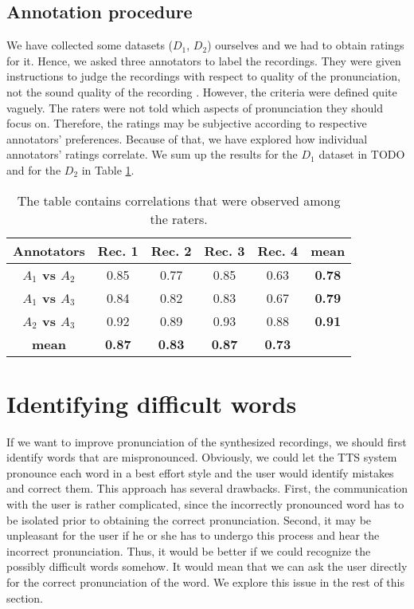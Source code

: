 \subsection{Annotation procedure}
We have collected some datasets ($D_1$, $D_2$) ourselves and we had to obtain ratings for it.
Hence, we asked three annotators to label the recordings.
They were given instructions to judge the recordings with respect to quality of the pronunciation, not the sound quality of the recording .
However, the criteria were defined quite vaguely.
The raters were not told which aspects of pronunciation they should focus on.
Therefore, the ratings may be subjective according to respective annotators' preferences.
Because of that, we have explored how individual annotators' ratings correlate.
We sum up the results for the $D_1$ dataset in TODO and for the $D_2$ in Table \ref{annotatorstbl}.
\begin{table}
\begin{center}
\begin{tabular}{ |c|c|c|c|c|c| } 
 \hline
 \textbf{Annotators} & \textbf{Rec. 1} & \textbf{Rec. 2} & \textbf{Rec. 3} & \textbf{Rec. 4} & \textbf{mean} \\ \hline
\textbf{$A_1$ vs $A_2$} & 0.85 & 0.77 & 0.85 & 0.63 & \textbf{0.78} \\ \hline
\textbf{$A_1$ vs $A_3$} & 0.84 & 0.82 & 0.83 & 0.67 & \textbf{0.79} \\ \hline 
\textbf{$A_2$ vs $A_3$} & 0.92 & 0.89 & 0.93 & 0.88 & \textbf{0.91} \\ \hline 
\textbf{mean} & \textbf{0.87} & \textbf{0.83} & \textbf{0.87} & \textbf{0.73} &  \\ \hline 
 \end{tabular}
\end{center}
\label{annotatorstbl}
\caption{The table contains correlations that were observed among the raters.}
\end{table}

\section{Identifying difficult words}
\label{ident-diff}
If we want to improve pronunciation of the synthesized recordings, we should first identify words that are mispronounced. Obviously, we could let the TTS system pronounce each word in a best effort style and  the user would identify mistakes and correct them. This approach has several drawbacks. First, the communication with the user is rather complicated, since the incorrectly pronounced word has to be isolated prior to obtaining the correct pronunciation.
Second, it may be unpleasant for the user if he or she has to undergo this process and hear the incorrect pronunciation. Thus, it would be better if we could recognize the possibly difficult words somehow. It would mean that we can ask the user directly for the correct pronunciation of the word. We explore this issue in the rest of this section.
